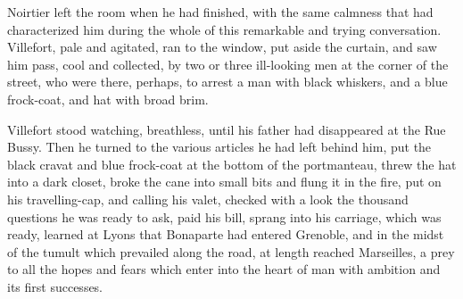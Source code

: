  Noirtier left the room when he had finished, with the same calmness that had characterized him during the whole of this remarkable and trying conversation. Villefort, pale and agitated, ran to the window, put aside the curtain, and saw him pass, cool and collected, by two or three ill-looking men at the corner of the street, who were there, perhaps, to arrest a man with black whiskers, and a blue frock-coat, and hat with broad brim. 

 Villefort stood watching, breathless, until his father had disappeared at the Rue Bussy. Then he turned to the various articles he had left behind him, put the black cravat and blue frock-coat at the bottom of the portmanteau, threw the hat into a dark closet, broke the cane into small bits and flung it in the fire, put on his travelling-cap, and calling his valet, checked with a look the thousand questions he was ready to ask, paid his bill, sprang into his carriage, which was ready, learned at Lyons that Bonaparte had entered Grenoble, and in the midst of the tumult which prevailed along the road, at length reached Marseilles, a prey to all the hopes and fears which enter into the heart of man with ambition and its first successes. 